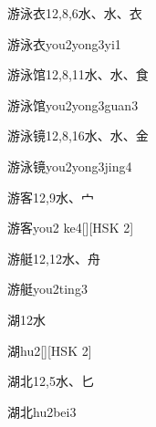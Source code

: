 \begin{entry}{游泳衣}{12,8,6}{⽔、⽔、⾐}
  \begin{phonetics}{游泳衣}{you2yong3yi1}
  \end{phonetics}
\end{entry}

\begin{entry}{游泳馆}{12,8,11}{⽔、⽔、⾷}
  \begin{phonetics}{游泳馆}{you2yong3guan3}
  \end{phonetics}
\end{entry}

\begin{entry}{游泳镜}{12,8,16}{⽔、⽔、⾦}
  \begin{phonetics}{游泳镜}{you2yong3jing4}
  \end{phonetics}
\end{entry}

\begin{entry}{游客}{12,9}{⽔、⼧}
  \begin{phonetics}{游客}{you2 ke4}[][HSK 2]
  \end{phonetics}
\end{entry}

\begin{entry}{游艇}{12,12}{⽔、⾈}
  \begin{phonetics}{游艇}{you2ting3}
  \end{phonetics}
\end{entry}

\begin{entry}{湖}{12}{⽔}
  \begin{phonetics}{湖}{hu2}[][HSK 2]
  \end{phonetics}
\end{entry}

\begin{entry}{湖北}{12,5}{⽔、⼔}
  \begin{phonetics}{湖北}{hu2bei3}
  \end{phonetics}
\end{entry}

